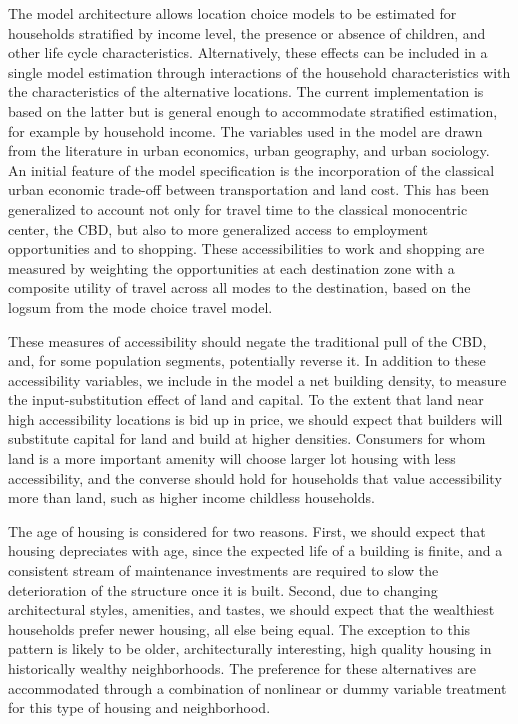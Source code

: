 The model architecture allows location choice models to be
estimated for households stratified by income level, the presence
or absence of children, and other life cycle characteristics.
Alternatively, these effects can be included in a single model
estimation through interactions of the household characteristics
with the characteristics of the alternative locations.  The
current implementation is based on the latter but is general
enough to accommodate stratified estimation, for example by
household income. The variables used in the model are drawn from
the literature in urban economics, urban geography, and urban
sociology.  An initial feature of the model specification is the
incorporation of the classical urban economic trade-off between
transportation and land cost. This has been generalized to account
not only for travel time to the classical monocentric center, the
CBD, but also to more generalized access to employment
opportunities and to shopping. These accessibilities to work and
shopping are measured by weighting the opportunities at each
destination zone with a composite utility of travel across all
modes to the destination, based on the logsum from the mode choice
travel model.

These measures of accessibility should negate the traditional pull
of the CBD, and, for some population segments, potentially reverse
it.  In addition to these accessibility variables, we include in
the model a net building density, to measure the
input-substitution effect of land and capital.  To the extent that
land near high accessibility locations is bid up in price, we
should expect that builders will substitute capital for land and
build at higher densities.  Consumers for whom land is a more
important amenity will choose larger lot housing with less
accessibility, and the converse should hold for households that
value accessibility more than land, such as higher income
childless households.

The age of housing is considered for two reasons.  First, we
should expect that housing depreciates with age, since the
expected life of a building is finite, and a consistent stream of
maintenance investments are required to slow the deterioration of
the structure once it is built.  Second, due to changing
architectural styles, amenities, and tastes, we should expect that
the wealthiest households prefer newer housing, all else being
equal.  The exception to this pattern is likely to be older,
architecturally interesting, high quality housing in historically
wealthy neighborhoods.  The preference for these alternatives are
accommodated through a combination of nonlinear or dummy variable
treatment for this type of housing and neighborhood.

